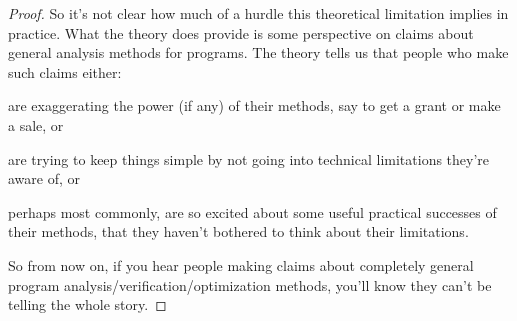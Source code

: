 \documentclass[14pt]{extarticle}
\begin{document}
\begin{proof}
So it's not clear how much of a hurdle this theoretical limitation implies in practice. What the theory does provide is some perspective on claims about general analysis methods for programs.
The theory tells us that people who make such claims either:

are exaggerating the power (if any) of their methods, say to get a grant or make a sale, or

are trying to keep things simple by not going into technical limitations they're aware of, or

perhaps most commonly, are so excited about some useful practical successes of their meth­ods, that they haven't bothered to think about their limitations.

So from now on, if you hear people making claims about completely general program analy­sis/verification/optimization methods, you'll know they can't be telling the whole story.
\end{proof}
\end{document}

